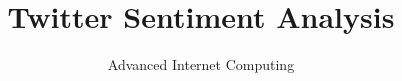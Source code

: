 \documentclass{sig-alternate}
\begin{document}
%

\title{Twitter Sentiment Analysis}
\subtitle{Advanced Internet Computing}

%
%
%
%
%
\end{document}
